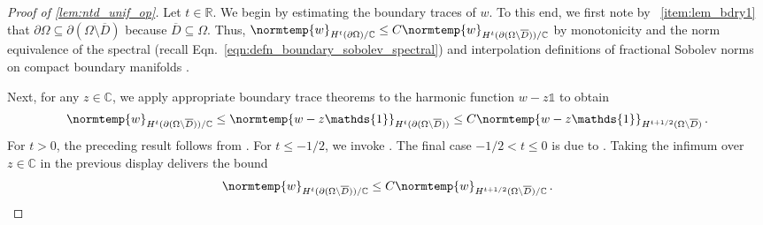 \documentclass[pdflatex,sn-mathphys-num]{sn-jnl-preprint}
\newcommand{\R}{\mathbb{R}}
\newcommand{\C}{\mathbb{C}}
\newcommand{\pOmega}{{\partial\Omega}}
\newcommand{\norm}{\normtemp}
\newcommand{\onebm}{\mathds{1}} %
\theoremstyle{thmstyleone}%
\theoremstyle{thmstyletwo}%
\theoremstyle{thmstylethree}%
\numberwithin{equation}{section}
\numberwithin{theorem}{section}
\begin{document}
\begin{appendices}
\begin{proof}[Proof of \cref{lem:ntd_unif_op}]
	Let $t\in\R$. We begin by estimating the boundary traces of $w$. To this end, we first note by ~\ref{item:lem_bdry1} that $\pOmega\subseteq \partial(\Omega\setminus\overline{D})$ because $\overline{D}\subseteq\Omega$. Thus, $\norm{w}_{H^t(\pOmega)/\C}\leq C\norm{w}_{H^t(\partial(\Omega\setminus\overline{D}))/\C}$ by monotonicity and the norm equivalence of the spectral (recall Eqn.~\ref{eqn:defn_boundary_sobolev_spectral}) and interpolation definitions of fractional Sobolev norms on compact boundary manifolds 
	\cite[Chp.~1, Sec.~7.3, pp.~34--37]{lions2012non}.
	
	Next, for any $z\in\C$, we apply appropriate boundary trace theorems to the harmonic function $w-z\onebm$ to obtain
	\begin{align*}
		\norm{w}_{H^t(\partial(\Omega\setminus\overline{D}))/\C}\leq \norm{w-z\onebm}_{H^t(\partial(\Omega\setminus\overline{D}))}\leq C \norm{w-z\onebm}_{H^{t+1/2}(\Omega\setminus\overline{D})}\,.
	\end{align*}
	For $t>0$, the preceding result follows from \cite[Chp.~1, Thm.~9.4, pp.~41--42, taking $\mu=0$ and $s=t+1/2$]{lions2012non}. For $t\leq -1/2$, we invoke \cite[Chp.~2, Thm.~6.5 and Remark 6.4, pp.~175--177, taking $m=1$, $m_0=0$, $r=-t-1/2$, and $A=-\Delta$]{lions2012non}. The final case $-1/2<t\leq 0$ is due to \cite[Chp.~2, Thm.~7.3, pp.~187--188, taking $m=1$, $m_0=0$, $0<s=t+1/2<2$, and $A=-\Delta$]{lions2012non}. Taking the infimum over $z\in\C$ in the previous display delivers the bound
	\begin{align*}
		\norm{w}_{H^t(\partial(\Omega\setminus\overline{D}))/\C}\leq C \norm{w}_{H^{t+1/2}(\Omega\setminus\overline{D})/\C}\,.
	\end{align*}
	

\end{proof}
\end{appendices}
\end{document}
